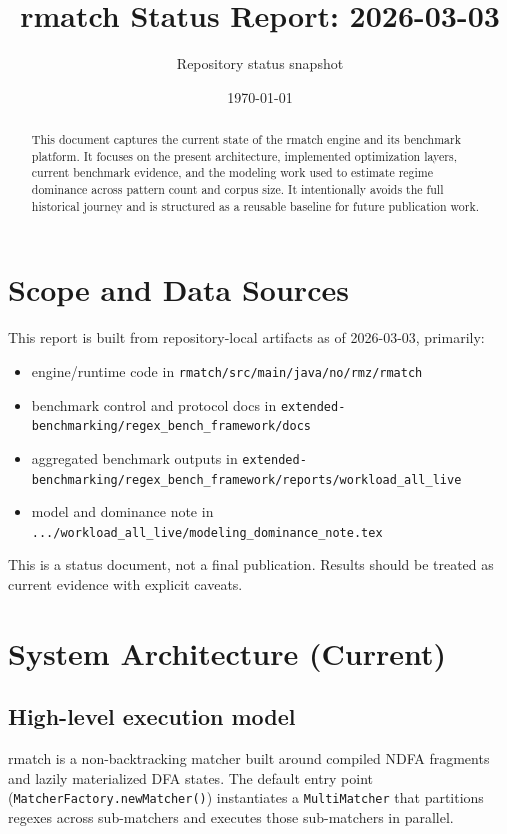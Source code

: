 \documentclass[11pt]{article}
\title{rmatch Status Report: 2026-03-03}
\author{Repository status snapshot}
\date{\today}
\begin{document}
\maketitle

\begin{abstract}
This document captures the current state of the rmatch engine and its benchmark platform. It focuses on the present architecture, implemented optimization layers, current benchmark evidence, and the modeling work used to estimate regime dominance across pattern count and corpus size. It intentionally avoids the full historical journey and is structured as a reusable baseline for future publication work.
\end{abstract}

\tableofcontents

\section{Scope and Data Sources}
This report is built from repository-local artifacts as of 2026-03-03, primarily:
\begin{itemize}
  \item engine/runtime code in \texttt{rmatch/src/main/java/no/rmz/rmatch}
  \item benchmark control and protocol docs in \texttt{extended-benchmarking/regex\_bench\_framework/docs}
  \item aggregated benchmark outputs in \texttt{extended-benchmarking/regex\_bench\_framework/reports/workload\_all\_live}
  \item model and dominance note in \texttt{.../workload\_all\_live/modeling\_dominance\_note.tex}
\end{itemize}

This is a status document, not a final publication. Results should be treated as current evidence with explicit caveats.

\section{System Architecture (Current)}
\subsection{High-level execution model}
rmatch is a non-backtracking matcher built around compiled NDFA fragments and lazily materialized DFA states. The default entry point (\texttt{MatcherFactory.newMatcher()}) instantiates a \texttt{MultiMatcher} that partitions regexes across sub-matchers and executes those sub-matchers in parallel.
\end{document}
